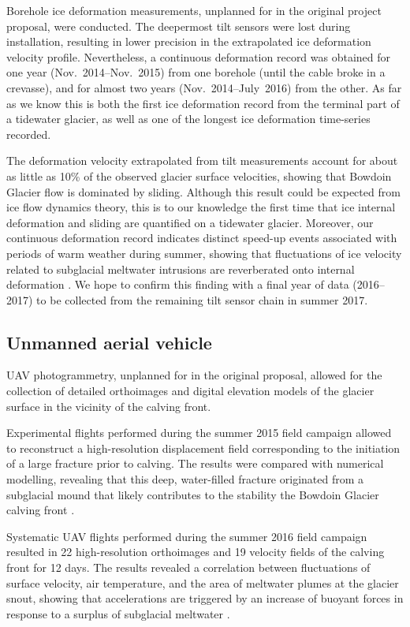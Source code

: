 \documentclass{article}
\begin{document}
Borehole ice deformation measurements, unplanned for in the original project
proposal, were conducted. The deepermost tilt sensors were lost during
installation, resulting in lower
precision in the extrapolated ice deformation velocity profile. Nevertheless, a
continuous deformation record was obtained for one year (Nov.~2014--Nov.~2015)
from one borehole (until the cable broke in a crevasse), and for almost two
years (Nov.~2014--July~2016) from the other. As far as we know this is both the
first ice deformation record from the terminal part of a tidewater glacier, as
well as one of the longest ice deformation time-series recorded.

The deformation velocity extrapolated from tilt measurements account for about
as little as 10\% of the observed glacier surface velocities, showing that
Bowdoin Glacier flow is dominated by sliding. Although this result could be
expected from ice flow dynamics theory, this is to our knowledge the first time
that ice internal deformation and sliding are quantified on a tidewater
glacier. Moreover, our continuous deformation record indicates distinct
speed-up events associated with periods of warm weather during summer, showing
that fluctuations of ice velocity related to subglacial meltwater intrusions
are reverberated onto internal deformation \citep{Seguinot.etal.Inprepa}. We
hope to confirm this finding with a final year of data (2016--2017) to be
collected from the remaining tilt sensor chain in summer 2017.


\subsection{Unmanned aerial vehicle}

UAV photogrammetry, unplanned for in the original proposal, allowed for the
collection of detailed orthoimages and digital elevation models of the glacier
surface in the vicinity of the calving front.

Experimental flights performed during the summer 2015 field campaign allowed to
reconstruct a high-resolution displacement field corresponding to the
initiation of a large fracture prior to calving. The results were compared with
numerical modelling, revealing that this deep, water-filled fracture originated
from a subglacial mound that likely contributes to the stability the Bowdoin
Glacier calving front \citep{Jouvet.etal.2016}.

Systematic UAV flights performed during the summer 2016 field campaign resulted
in 22 high-resolution orthoimages and 19 velocity fields of the calving front
for 12 days. The results revealed a correlation between fluctuations of surface
velocity, air temperature, and the area of meltwater plumes at the glacier
snout, showing that accelerations are triggered by an increase of buoyant
forces in response to a surplus of subglacial meltwater
\citep{Jouvet.etal.inprep}.
\end{document}
